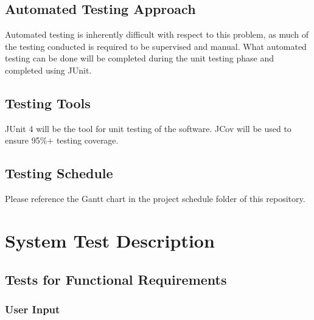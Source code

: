 \documentclass[12pt, titlepage]{article}
\begin{document}
\subsection{Automated Testing Approach}
Automated testing is inherently difficult with respect to this problem, as much of the testing conducted is required to be supervised and manual. What automated testing can be done will be completed during the unit testing phase and completed using JUnit.
\subsection{Testing Tools}
\par JUnit 4 will be the tool for unit testing of the software. JCov will be used to ensure 95\%+ testing coverage.
\subsection{Testing Schedule}
Please reference the Gantt chart in the project schedule folder of this repository.
\section{System Test Description}
	
\subsection{Tests for Functional Requirements}
\subsubsection{User Input}
\end{document}
